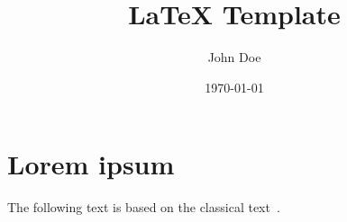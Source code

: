 \documentclass{article}
\title{LaTeX Template}
\author{John Doe}
\date{\today}
\begin{document}
\maketitle

\begin{abstract}
    \lipsum[1]
\end{abstract}

\section{Lorem ipsum}

The following text is based on the classical text~\cite{lipsum}.
\lipsum



\end{document}

